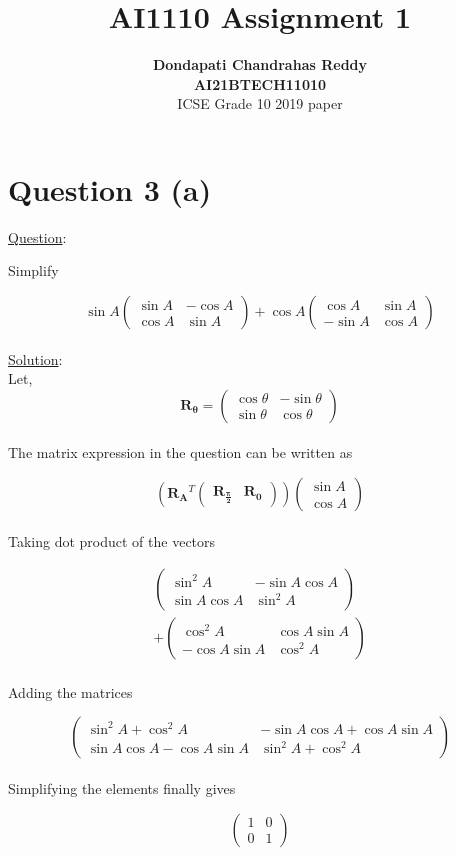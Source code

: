 \documentclass[journal,12pt,twocolumn]{IEEEtran}
\newcommand{\myvec}[1]{\ensuremath{\begin{pmatrix}#1\end{pmatrix}}}
\let\vec\mathbf
\begin{document}
\title{\textbf{AI1110 Assignment 1} }
\author{\textbf{Dondapati Chandrahas Reddy}\\ \textbf{AI21BTECH11010}\\ ICSE Grade 10 2019 paper}

\maketitle

{\section {Question 3 (a) \newline}}

{\large \underline{Question}:\newline}

Simplify

\begin{equation}
	\sin A\myvec{\sin A &  -\cos A \\ \cos A & \sin A} + \cos A \myvec{\cos A &  \sin A \\ -\sin A & \cos A}
\end{equation}\\

{\large \underline{Solution}:}\\

Let,
\begin{equation}
	\vec{R_\theta} = \myvec{\cos \theta &  -\sin \theta \\ \sin \theta & \cos \theta}
\end{equation}\\

The matrix expression in the question can be written as

\begin{equation}
	\left(\vec{R_A}^T \myvec{\vec{R_{\frac{\pi}{2}}} & \vec{R_0}}\right) \myvec{\sin A \\ \cos A}
\end{equation}\\

Taking dot product of the vectors

\begin{multline}
	\myvec{\sin^2 A &  -\sin A\cos A \\ \sin A\cos A & \sin^2 A} \\ 
	+ \myvec{\cos^2 A & \cos A\sin A \\ -\cos A\sin A & \cos^2 A}
\end{multline}\\

Adding the matrices

\begin{equation}
	\myvec{\sin^2 A + \cos^2 A &  -\sin A \cos A +\cos A \sin A \\ \sin A \cos A -\cos A \sin A & \sin^2 A + \cos^2 A}
\end{equation}\\

Simplifying the elements finally gives

\begin{equation}
	\myvec{1 & 0 \\ 0 & 1}
\end{equation}\\
\end{document}
